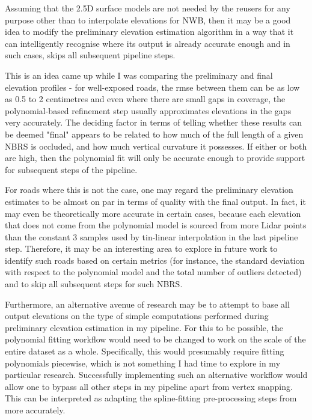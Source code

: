 Assuming that the 2.5D surface models are not needed by the reusers for any purpose other than to interpolate elevations for NWB, then it may be a good idea to modify the preliminary elevation estimation algorithm in a way that it can intelligently recognise where its output is already accurate enough and in such cases, skips all subsequent pipeline steps.

This is an idea came up while I was comparing the preliminary and final elevation profiles - for well-exposed roads, the \ac{rmse} between them can be as low as 0.5 to 2 centimetres and even where there are small gaps in coverage, the polynomial-based refinement step usually approximates elevations in the gaps very accurately. The deciding factor in terms of telling whether these results can be deemed "final" appears to be related to how much of the full length of a given NBRS is occluded, and how much vertical curvature it possesses. If either or both are high, then the polynomial fit will only be accurate enough to provide support for subsequent steps of the pipeline.

For roads where this is not the case, one may regard the preliminary elevation estimates to be almost on par in terms of quality with the final output. In fact, it may even be theoretically more accurate in certain cases, because each elevation that does not come from the polynomial model is sourced from more Lidar points than the constant 3 samples used by \ac{tin}-linear interpolation in the last pipeline step. Therefore, it may be an interesting area to explore in future work to identify such roads based on certain metrics (for instance, the standard deviation with respect to the polynomial model and the total number of outliers detected) and to skip all subsequent steps for such NBRS.

Furthermore, an alternative avenue of research may be to attempt to base all output elevations on the type of simple computations performed during preliminary elevation estimation in my pipeline. For this to be possible, the polynomial fitting workflow would need to be changed to work on the scale of the entire dataset as a whole. Specifically, this would presumably require fitting polynomials piecewise, which is not something I had time to explore in my particular research. Successfully implementing such an alternative workflow would allow one to bypass all other steps in my pipeline apart from vertex snapping. This can be interpreted as adapting the spline-fitting pre-processing steps from \cite{boyko_funkhauser_2011} more accurately.

